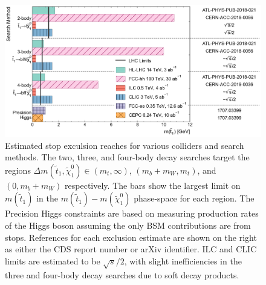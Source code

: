 \documentclass[11pt]{article}
\begin{document}
\begin{figure}
    \centering
    \includegraphics[width=\textwidth]{stop.png}
    \caption{Estimated stop exculsion reaches for various colliders and search methods. 
    The two, three, and four-body decay searches target the regions $\Delta m(\widetilde{t}_1, \widetilde{\chi}_1^0) \in (m_t, \infty)$, $(m_b + m_W, m_t)$, and $(0, m_b + m_W)$ respectively. 
    The bars show the largest limit on $m(\widetilde{t}_1)$ in the $m(\widetilde{t}_1)-m(\widetilde{\chi}_1^0)$ phase-space for each region. 
    The Precision Higgs constraints are based on measuring production rates of the Higgs boson assuming the only BSM contributions are from stops. 
    References for each exclusion estimate are shown on the right as either the CDS report number or arXiv identifier. 
    ILC and CLIC limits are estimated to be $\sqrt{s}/2$, with slight inefficiencies in the three and four-body decay searches due to soft decay products. }
\end{figure}
\end{document}
